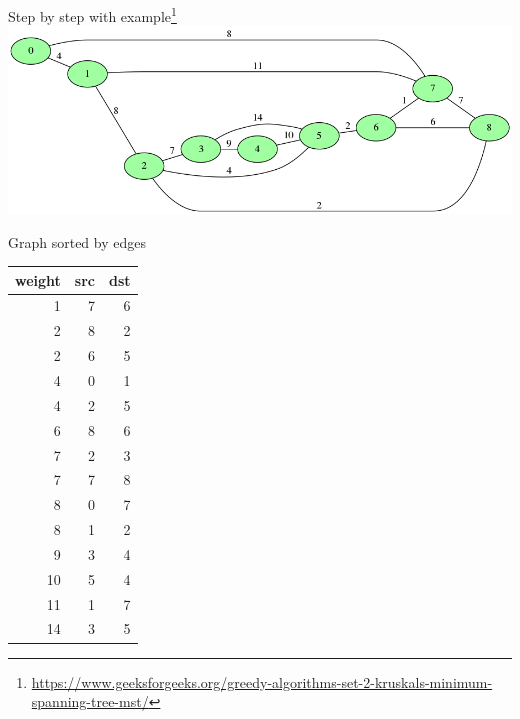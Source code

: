 \documentclass[presentation]{beamer}
\begin{document}
\begin{frame}[label={sec:orgheadline7}]{Step by step with example\footnote{\url{https://www.geeksforgeeks.org/greedy-algorithms-set-2-kruskals-minimum-spanning-tree-mst/}}}
\includegraphics[width=1\textwidth]{images/example-1.png}
\end{frame}

\begin{frame}[label={sec:orgheadline8}]{Graph sorted by edges}
\begin{center}
\begin{tabular}{rrr}
weight & src & dst\\
\hline
1 & 7 & 6\\
2 & 8 & 2\\
2 & 6 & 5\\
4 & 0 & 1\\
4 & 2 & 5\\
6 & 8 & 6\\
7 & 2 & 3\\
7 & 7 & 8\\
8 & 0 & 7\\
8 & 1 & 2\\
9 & 3 & 4\\
10 & 5 & 4\\
11 & 1 & 7\\
14 & 3 & 5\\
\end{tabular}
\end{center}
\end{frame}
\end{document}
